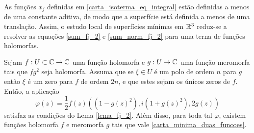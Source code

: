 \begin{observacao}
	As funções $x_j$ definidas em \eqref{carta_isoterma_eq_integral} estão definidas a menos de uma constante aditiva, de modo que a superfície está definida a menos de uma translação. Assim, o estudo local de superfícies mínimas em $\mathbb{R}^3$ reduz-se a resolver as equações \eqref{sum_fj_2} e \eqref{sum_norm_fj_2} para uma terna de funções holomorfas.
\end{observacao}

\begin{teorema}\label{teorema-de-representacao-de-weierstrass}
	Sejam $f: U \subset \mathbb{C} \rightarrow \mathbb{C}$ uma função holomorfa e $g: U \rightarrow \mathbb{C}$ uma função meromorfa tais que $fg^2$ seja holomorfa. Assuma que se $\xi \in U$ é um polo de ordem $n$ para $g$ então $\xi$ é um zero para $f$ de ordem $2n$, e que estes sejam os únicos zeros de $f$.
	Então, a aplicação
	\begin{equation}\label{carta_minima_duas_funcoes}
	\varphi(z) = \frac{1}{2} f(z) \left( (1-g(z)^2), i (1+g(z)^2), 2g(z) \right)
	\end{equation}
	satisfaz as condições do Lema \ref{lema_fj_2}. Além disso, para toda tal $\varphi$, existem funções holomorfa $f$ e meromorfa $g$ tais que vale \eqref{carta_minima_duas_funcoes}.
\end{teorema}

